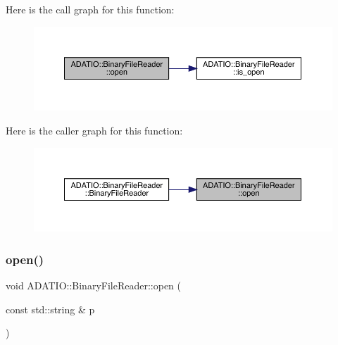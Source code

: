 Here is the call graph for this function\+:\nopagebreak
\begin{figure}[H]
\begin{center}
\leavevmode
\includegraphics[width=350pt]{df/d41/classADATIO_1_1BinaryFileReader_a5a7c5bb025902fd04642fb154542dc6a_cgraph}
\end{center}
\end{figure}
Here is the caller graph for this function\+:\nopagebreak
\begin{figure}[H]
\begin{center}
\leavevmode
\includegraphics[width=350pt]{df/d41/classADATIO_1_1BinaryFileReader_a5a7c5bb025902fd04642fb154542dc6a_icgraph}
\end{center}
\end{figure}
\mbox{\label{classADATIO_1_1BinaryFileReader_a5a7c5bb025902fd04642fb154542dc6a}} 
\subsubsection{\texorpdfstring{open()}{open()}\hspace{0.1cm}{\footnotesize\ttfamily [2/2]}}
{\footnotesize\ttfamily void A\+D\+A\+T\+I\+O\+::\+Binary\+File\+Reader\+::open (\begin{DoxyParamCaption}\item[{const std\+::string \&}]{p }\end{DoxyParamCaption})}

\mbox{\label{classADATIO_1_1BinaryFileReader_a4f15e41f00be97ad3a0e8bb97c90b704}} 
